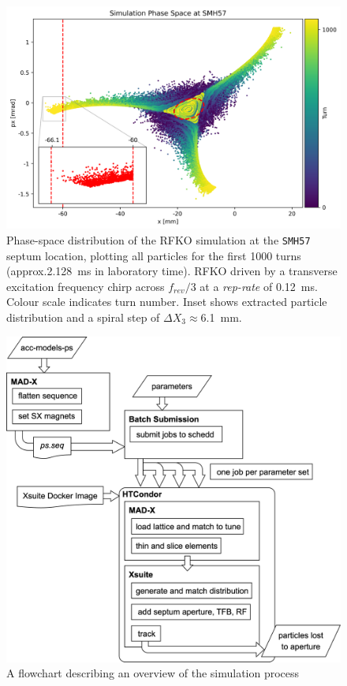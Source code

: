 \documentclass[a4paper,twoside,11pt]{report}
\begin{document}
\begin{figure}[h]
  \centering
  \includegraphics[width=0.9\linewidth]{phase-space-sim.png}
  \cprotect\caption[Simulated RFKO phase-space distribution at extraction septum]{Phase-space distribution of the RFKO simulation at the \verb|SMH57| septum location, plotting all particles for the first 1000 turns (approx.\qty{2.128}{\milli\second} in laboratory time). RFKO driven by a transverse excitation frequency chirp across $f_{rev}/3$ at a \textit{rep-rate} of \qty{0.12}{\milli\second}. Colour scale indicates turn number. Inset shows extracted particle distribution and a spiral step of $\Delta X_3\approx$\qty{6.1}{\milli\meter}.}\label{fig:phase-space-sim}
\end{figure}



\begin{figure}[h]
  \centering
  \includegraphics*[width=0.85\linewidth]{simulation-flowchart.png}
  \caption{A flowchart describing an overview of the simulation process}\label{fig:flowchart}
\end{figure}
\end{document}
